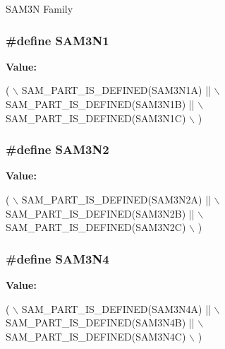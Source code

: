S\-A\-M3\-N Family \hypertarget{group__sam__part__macros__group_gaf58a7d141f31d6db97223dfd62d92905}{
\subsubsection[{S\-A\-M3\-N1}]{\setlength{\rightskip}{0pt plus 5cm}\#define S\-A\-M3\-N1}}\label{group__sam__part__macros__group_gaf58a7d141f31d6db97223dfd62d92905}
{\bfseries Value\-:}
\begin{DoxyCode}
( \(\backslash\)
        SAM\_PART\_IS\_DEFINED(SAM3N1A) || \(\backslash\)
        SAM\_PART\_IS\_DEFINED(SAM3N1B) || \(\backslash\)
        SAM\_PART\_IS\_DEFINED(SAM3N1C) \(\backslash\)
        )
\end{DoxyCode}
\hypertarget{group__sam__part__macros__group_ga96514eddac4935925994ef85ca9d12ac}{
\subsubsection[{S\-A\-M3\-N2}]{\setlength{\rightskip}{0pt plus 5cm}\#define S\-A\-M3\-N2}}\label{group__sam__part__macros__group_ga96514eddac4935925994ef85ca9d12ac}
{\bfseries Value\-:}
\begin{DoxyCode}
( \(\backslash\)
        SAM\_PART\_IS\_DEFINED(SAM3N2A) || \(\backslash\)
        SAM\_PART\_IS\_DEFINED(SAM3N2B) || \(\backslash\)
        SAM\_PART\_IS\_DEFINED(SAM3N2C) \(\backslash\)
        )
\end{DoxyCode}
\hypertarget{group__sam__part__macros__group_ga1d47bffd90ddbb0dac3874edbafb3803}{
\subsubsection[{S\-A\-M3\-N4}]{\setlength{\rightskip}{0pt plus 5cm}\#define S\-A\-M3\-N4}}\label{group__sam__part__macros__group_ga1d47bffd90ddbb0dac3874edbafb3803}
{\bfseries Value\-:}
\begin{DoxyCode}
( \(\backslash\)
        SAM\_PART\_IS\_DEFINED(SAM3N4A) || \(\backslash\)
        SAM\_PART\_IS\_DEFINED(SAM3N4B) || \(\backslash\)
        SAM\_PART\_IS\_DEFINED(SAM3N4C) \(\backslash\)
        )
\end{DoxyCode}
